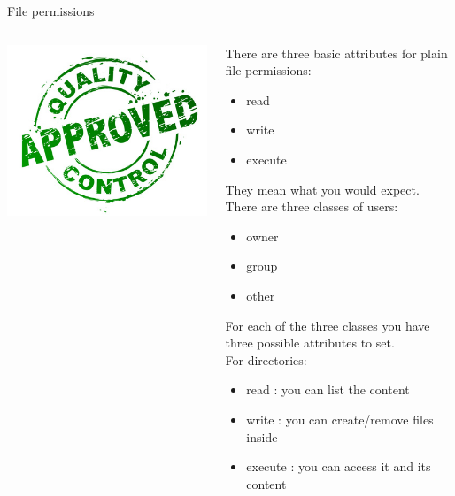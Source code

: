 \documentclass[unknownkeysallowed, 10pt, a4 paper, handout]{beamer}
\begin{document}
\begin{frame}[label=permission]{File permissions}
  \begin{columns}[T]
    \begin{column}{.11\textwidth}
      \includegraphics[scale=0.15]{pics/Timbro.jpg}
    \end{column}
    \hfill
    \begin{column}{.89\textwidth}
      \small{
      There are three basic attributes for plain file permissions:
      \begin{itemize}
         \item read
         \item write
         \item execute
      \end{itemize}
      They mean what you would expect. There are three classes of users:
      \begin{itemize}
         \item owner
         \item group
         \item other
      \end{itemize}
      For each of the three classes you have three possible attributes
      to set. \\
      \vspace{10pt}
      For directories:
      \begin{itemize}
         \item read : you can list the content
         \item write : you can create/remove files inside
         \item execute : you can access it and its content
      \end{itemize}
    }
    \end{column}
  \end{columns}
\end{frame}
\end{document}
